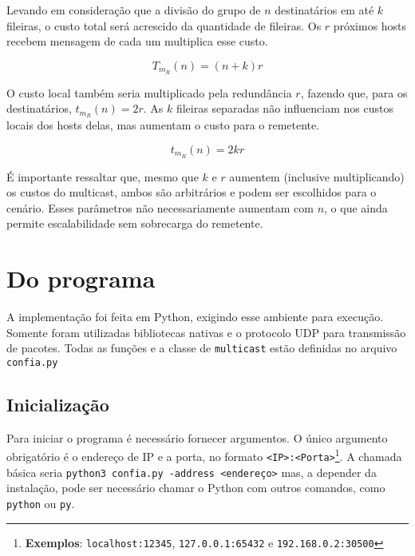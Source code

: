 \documentclass[12pt,twocolumn]{article}
\begin{document}
					Levando em consideração que a divisão do grupo de $n$ destinatários em até $k$ fileiras, o custo total será acrescido da quantidade de fileiras.	
					Os $r$ próximos hosts recebem mensagem de cada um multiplica esse custo.
					
					\begin{equation} \label{eq:multicast_row_safe}
						T_{m_R} (n) = (n + k)r
					\end{equation}
				
					O custo local também seria multiplicado pela redundância $r$, fazendo que, para os destinatários, $t_{m_R} (n) = 2r$.
					As $k$ fileiras separadas não influenciam nos custos locais dos hosts delas, mas aumentam o custo para o remetente.
			
					\begin{equation} \label{eq:multicast_row_safe_local}
						t_{m_R} (n) = 2kr
					\end{equation}
				
					É importante ressaltar que, mesmo que $k$ e $r$ aumentem (inclusive multiplicando) os custos do multicast, ambos são arbitrários e podem ser escolhidos para o cenário.
					Esses parâmetros não necessariamente aumentam com $n$, o que ainda permite escalabilidade sem sobrecarga do remetente.
					
					
	\section{Do programa}			
	
		A implementação foi feita em Python, exigindo esse ambiente para execução.
		Somente foram utilizadas bibliotecas nativas e o protocolo UDP para transmissão de pacotes. 
		Todas as funções e a classe de \texttt{multicast} estão definidas no arquivo \texttt{confia.py}
		
		\subsection{Inicialização}
		
			Para iniciar o programa é necessário fornecer argumentos.   	
			O único argumento obrigatório é o endereço de IP e a porta, no formato \texttt{<IP>:<Porta>}\footnote{\textbf{Exemplos}: \texttt{localhost:12345}, \texttt{127.0.0.1:65432} e \texttt{192.168.0.2:30500}}.
			A chamada básica seria \texttt{python3 confia.py -address <endereço>} mas, a depender da instalação, pode ser necessário chamar o Python com outros comandos, como \texttt{python} ou \texttt{py}.
			
\end{document}
